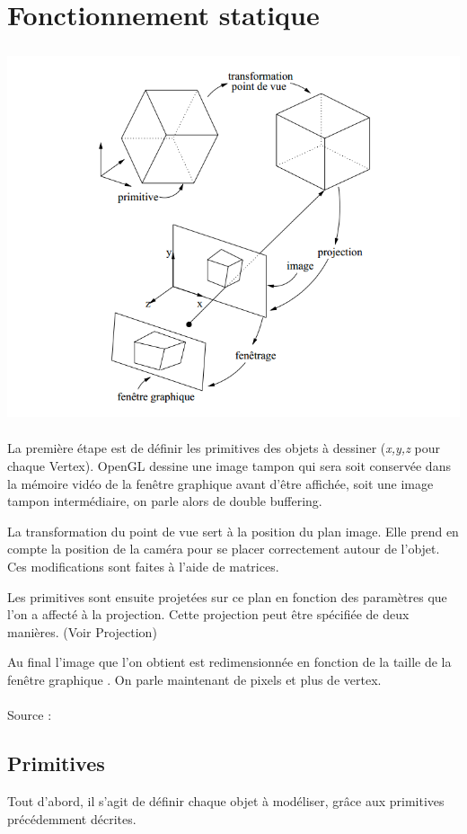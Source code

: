 \section{Fonctionnement statique}
\begin{center}
	 \includegraphics[height=11cm]{img/Fonctionnement}
 \end{center}

La première étape est de définir les primitives des objets à dessiner (\textit{x,y,z} pour chaque Vertex).
OpenGL dessine une image tampon qui sera soit conservée dans la mémoire vidéo de la fenêtre graphique avant d’être affichée, soit une image tampon intermédiaire, on parle alors de double buffering.

La transformation du point de vue sert à la position du plan image. Elle prend en compte la position de la caméra pour se placer correctement autour de l'objet. Ces modifications sont faites à l'aide de matrices. 

Les primitives sont ensuite projetées sur ce plan en fonction des paramètres que l’on a affecté à la projection. Cette projection peut être spécifiée de deux manières. (Voir Projection)

Au final l’image que l’on obtient est redimensionnée en fonction de la taille de la fenêtre graphique . On parle maintenant de pixels et plus de vertex.
\\\\
Source : \cite{OpenGL}
\newpage

\subsection{Primitives}
Tout d'abord, il s'agit de définir chaque objet à modéliser, grâce aux primitives précédemment décrites.


